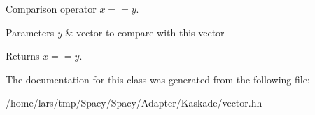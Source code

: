 Comparison operator $ x==y$. 


\begin{DoxyParams}{Parameters}
{\em y} & vector to compare with this vector \\
\hline
\end{DoxyParams}
\begin{DoxyReturn}{Returns}
$ x==y$. 
\end{DoxyReturn}


The documentation for this class was generated from the following file\+:\begin{DoxyCompactItemize}
\item 
/home/lars/tmp/\+Spacy/\+Spacy/\+Adapter/\+Kaskade/vector.\+hh\end{DoxyCompactItemize}
